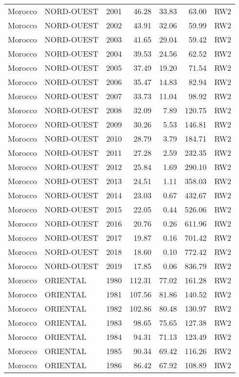 \begin{longtable}{lllrrrl}
  Morocco & NORD-OUEST & 2001 & 46.28 & 33.83 & 63.00 & RW2 \\ 
  Morocco & NORD-OUEST & 2002 & 43.91 & 32.06 & 59.99 & RW2 \\ 
  Morocco & NORD-OUEST & 2003 & 41.65 & 29.04 & 59.42 & RW2 \\ 
  Morocco & NORD-OUEST & 2004 & 39.53 & 24.56 & 62.52 & RW2 \\ 
  Morocco & NORD-OUEST & 2005 & 37.49 & 19.20 & 71.54 & RW2 \\ 
  Morocco & NORD-OUEST & 2006 & 35.47 & 14.83 & 82.94 & RW2 \\ 
  Morocco & NORD-OUEST & 2007 & 33.73 & 11.04 & 98.92 & RW2 \\ 
  Morocco & NORD-OUEST & 2008 & 32.09 & 7.89 & 120.75 & RW2 \\ 
  Morocco & NORD-OUEST & 2009 & 30.26 & 5.53 & 146.81 & RW2 \\ 
  Morocco & NORD-OUEST & 2010 & 28.79 & 3.79 & 184.71 & RW2 \\ 
  Morocco & NORD-OUEST & 2011 & 27.28 & 2.59 & 232.35 & RW2 \\ 
  Morocco & NORD-OUEST & 2012 & 25.84 & 1.69 & 290.10 & RW2 \\ 
  Morocco & NORD-OUEST & 2013 & 24.51 & 1.11 & 358.03 & RW2 \\ 
  Morocco & NORD-OUEST & 2014 & 23.03 & 0.67 & 432.67 & RW2 \\ 
  Morocco & NORD-OUEST & 2015 & 22.05 & 0.44 & 526.06 & RW2 \\ 
  Morocco & NORD-OUEST & 2016 & 20.76 & 0.26 & 611.96 & RW2 \\ 
  Morocco & NORD-OUEST & 2017 & 19.87 & 0.16 & 701.42 & RW2 \\ 
  Morocco & NORD-OUEST & 2018 & 18.60 & 0.10 & 772.42 & RW2 \\ 
  Morocco & NORD-OUEST & 2019 & 17.85 & 0.06 & 836.79 & RW2 \\ 
  Morocco & ORIENTAL & 1980 & 112.31 & 77.02 & 161.28 & RW2 \\ 
  Morocco & ORIENTAL & 1981 & 107.56 & 81.86 & 140.52 & RW2 \\ 
  Morocco & ORIENTAL & 1982 & 102.86 & 80.48 & 130.97 & RW2 \\ 
  Morocco & ORIENTAL & 1983 & 98.65 & 75.65 & 127.38 & RW2 \\ 
  Morocco & ORIENTAL & 1984 & 94.31 & 71.13 & 123.49 & RW2 \\ 
  Morocco & ORIENTAL & 1985 & 90.34 & 69.42 & 116.26 & RW2 \\ 
  Morocco & ORIENTAL & 1986 & 86.42 & 67.92 & 108.89 & RW2 \\ 

\end{longtable}

